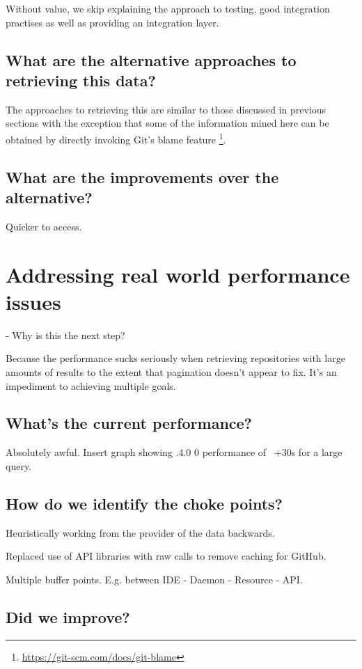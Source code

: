 Without value, we skip explaining the approach to testing, good integration practises as well as providing an integration layer.

\subsection{What are the alternative approaches to retrieving this data?}

The approaches to retrieving this are similar to those discussed in previous sections with the exception that some of the information mined here can be obtained by directly invoking Git's blame feature \footnote{\url{https://git-scm.com/docs/git-blame}}.

\subsection{What are the improvements over the alternative?}

Quicker to access.

\section{Addressing real world performance issues}

- Why is this the next step?

Because the performance sucks seriously when retrieving repositories with large amounts of results to the extent that pagination doesn't appear to fix. It's an impediment to achieving multiple goals.

\subsection{What's the current performance?}

Absolutely awful. Insert graph showing .4.0 0 performance of ~+30s for a large query.

\subsection{How do we identify the choke points?}

Heuristically working from the provider of the data backwards.

Replaced use of API libraries with raw calls to remove caching for GitHub.

Multiple buffer points. E.g. between IDE - Daemon - Resource - API.

\subsection{Did we improve?}

